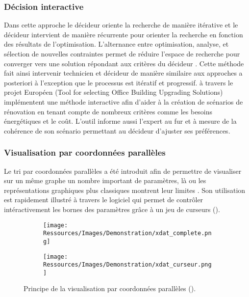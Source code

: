 \subsubsection{Décision interactive} %
\label{ssub:decision_interactive}
Dans cette approche le décideur oriente la recherche de manière itérative et le décideur
intervient de manière récurrente pour orienter la recherche en fonction des résultats de
l’optimisation. L’alternance entre optimisation, analyse, et sélection de nouvelles
contraintes permet de réduire l’espace de recherche pour converger vers une solution
répondant aux critères du décideur \parencite{Hwang1979}. Cette méthode fait ainsi
intervenir technicien et décideur de manière similaire aux approches a posteriori à
l’exception que le processus est itératif et progressif.
\textcite{Flourentzou2002185} à travers le projet Européen  (Tool for selecting Office Building
Upgrading Solutions) implémentent une méthode interactive afin d’aider
à la création de scénarios de rénovation en tenant compte de nombreux critères comme les
besoins énergétiques et le coût. L’outil informe aussi l’expert au fur et à mesure de la
cohérence de son scénario permettant au décideur d’ajuster ses préférences.


\subsubsection{Visualisation par coordonnées parallèles} %
\label{ssub:visualisation_par_coordonnees_paralleles}
Le tri par coordonnées parallèles a été introduit afin de permettre de visualiser
sur un même graphe un nombre important de paramètres, là ou les représentations
graphiques plus classiques montrent leur limites \parencite{Inselberg198725}.
Son utilisation est rapidement illustré à travers le logiciel 
qui permet de contrôler intéractivement les bornes des paramètres grâce à un jeu de
curseurs ().

\begin{figure}
    \centering
    \begin{subfigure}[b]{0.48\textwidth}
        \centering
        \texttt{[image: Ressources/Images/Demonstration/xdat\_complete.png]}
        \caption{}
        \label{fig:xdat_complete}
    \end{subfigure}
    \quad
    \begin{subfigure}[b]{0.48\textwidth}
        \centering
        \texttt{[image: Ressources/Images/Demonstration/xdat\_curseur.png]}
        \caption{}
        \label{fig:xdat_curseur}
    \end{subfigure}
    \caption[Principe de la visualisation par coordonnées parallèles]
            {Principe de la visualisation par coordonnées parallèles
             ().}
    \label{fig:principe_xdat}
\end{figure}

